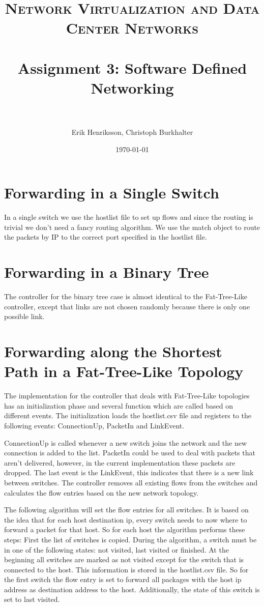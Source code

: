 \documentclass[paper=a4, fontsize=11pt]{scrartcl} %
\title{	
\normalfont \normalsize 
\textsc{Network Virtualization and Data Center Networks} \\ [25pt] %
\horrule{0.5pt} \\[0.4cm] %
\huge Assignment 3: Software Defined Networking\\ %
\horrule{2pt} \\[0.5cm] %
}
\author{Erik Henriksson, Christoph Burkhalter} %
\date{\normalsize\today} %
\numberwithin{equation}{section} %
\numberwithin{figure}{section} %
\numberwithin{table}{section} %
\begin{document}
\maketitle %

\section{Forwarding in a Single Switch}

In a single switch we use the hostlist file to set up flows and since the routing is trivial we don't need a fancy routing algorithm. We use the match object to route the packets by IP to the correct port specified in the hostlist file. 

\section{Forwarding in a Binary Tree}

The controller for the binary tree case is almost identical to the Fat-Tree-Like controller, except that links are not chosen randomly because there is only one possible link.

\section{Forwarding along the Shortest Path in a Fat-Tree-Like Topology}

The implementation for the controller that deals with Fat-Tree-Like topologies has an initialization phase and several function which are called based on different events. The initialization loads the hostlist.csv file and registers to the following events: ConnectionUp, PacketIn and LinkEvent.

ConnectionUp is called whenever a new switch joins the network and the new connection is added to the list. PacketIn could be used to deal with packets that aren't delivered, however, in the current implementation these packets are dropped. The last event is the LinkEvent, this indicates that there is a new link between switches. The controller removes all existing flows from the switches and calculates the flow entries based on the new network topology. 

The following algorithm will set the flow entries for all switches. It is based on the idea that for each host destination ip, every switch needs to now where to forward a packet for that host.
So for each host the algorithm performs these steps:
First the list of switches is copied. During the algorithm, a switch must be in one of the following states: not visited, last visited or finished. At the beginning all switches are marked as not visited except for the switch that is connected to the host. This information is stored in the hostlist.csv file. So for the first switch the flow entry is set to forward all packages with the host ip address as destination address to the host. Additionally, the state of this switch is set to last visited.
\end{document}
